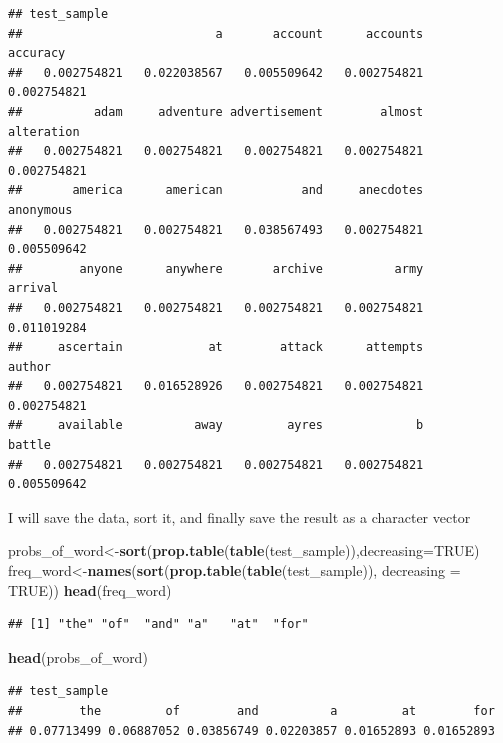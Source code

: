 \documentclass[]{book}
\newenvironment{Shaded}{\begin{snugshade}}{\end{snugshade}}
\newcommand{\KeywordTok}[1]{\textcolor[rgb]{0.13,0.29,0.53}{\textbf{#1}}}
\newcommand{\DataTypeTok}[1]{\textcolor[rgb]{0.13,0.29,0.53}{#1}}
\newcommand{\OtherTok}[1]{\textcolor[rgb]{0.56,0.35,0.01}{#1}}
\newcommand{\NormalTok}[1]{#1}
\theoremstyle{definition}
\theoremstyle{definition}
\theoremstyle{definition}
\theoremstyle{remark}
\begin{document}
\begin{verbatim}
## test_sample
##                           a       account      accounts      accuracy 
##   0.002754821   0.022038567   0.005509642   0.002754821   0.002754821 
##          adam     adventure advertisement        almost    alteration 
##   0.002754821   0.002754821   0.002754821   0.002754821   0.002754821 
##       america      american           and     anecdotes     anonymous 
##   0.002754821   0.002754821   0.038567493   0.002754821   0.005509642 
##        anyone      anywhere       archive          army       arrival 
##   0.002754821   0.002754821   0.002754821   0.002754821   0.011019284 
##     ascertain            at        attack      attempts        author 
##   0.002754821   0.016528926   0.002754821   0.002754821   0.002754821 
##     available          away         ayres             b        battle 
##   0.002754821   0.002754821   0.002754821   0.002754821   0.005509642
\end{verbatim}

I will save the data, sort it, and finally save the result as a
character vector

\begin{Shaded}
\begin{Highlighting}[]
\NormalTok{probs_of_word<-}\KeywordTok{sort}\NormalTok{(}\KeywordTok{prop.table}\NormalTok{(}\KeywordTok{table}\NormalTok{(test_sample)),}\DataTypeTok{decreasing=}\OtherTok{TRUE}\NormalTok{)}
\NormalTok{freq_word<-}\KeywordTok{names}\NormalTok{(}\KeywordTok{sort}\NormalTok{(}\KeywordTok{prop.table}\NormalTok{(}\KeywordTok{table}\NormalTok{(test_sample)), }\DataTypeTok{decreasing =} \OtherTok{TRUE}\NormalTok{))}
\KeywordTok{head}\NormalTok{(freq_word)}
\end{Highlighting}
\end{Shaded}

\begin{verbatim}
## [1] "the" "of"  "and" "a"   "at"  "for"
\end{verbatim}

\begin{Shaded}
\begin{Highlighting}[]
\KeywordTok{head}\NormalTok{(probs_of_word)}
\end{Highlighting}
\end{Shaded}

\begin{verbatim}
## test_sample
##        the         of        and          a         at        for 
## 0.07713499 0.06887052 0.03856749 0.02203857 0.01652893 0.01652893
\end{verbatim}
\end{document}
